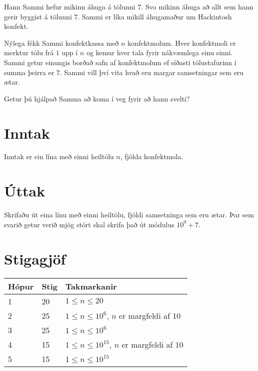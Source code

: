 
Hann Sammi hefur mikinn áhuga á tölunni $7$. Svo mikinn áhuga að allt sem hann gerir byggist á tölunni $7$. Sammi er líka mikill áhugamaður um Hackintosh konfekt.

Nýlega fékk Sammi konfektkassa með $n$ konfektmolum.
Hver konfektmoli er merktur tölu frá $1$ upp í $n$ og kemur hver tala fyrir nákvæmlega einu sinni.
Sammi getur einungis borðað safn af konfektmolum ef síðasti tölustafurinn í summa þeirra er $7$.
Sammi vill því vita hvað eru margar samsetningar sem eru ætar.

Getur þú hjálpað Samma að koma í veg fyrir að hann svelti?

\section*{Inntak}
Inntak er ein lína með einni heiltölu $n$, fjölda konfektmola.

\section*{Úttak}
Skrifaðu út eina línu með einni heiltölu, fjöldi samsetninga sem eru ætar.
Þar sem svarið getur verið mjög stórt skal skrifa það út módulus $10^9 + 7$.

\section*{Stigagjöf}
\begin{tabular}{|l|l|l|}
\hline
Hópur & Stig & Takmarkanir \\ \hline
1     & 20     & $1 \leq n \leq 20$ \\ \hline
2     & 25     & $1 \leq n \leq 10^6$, $n$ er margfeldi af 10 \\ \hline
3     & 25     & $1 \leq n \leq 10^6$ \\ \hline
4     & 15     & $1 \leq n \leq 10^{15}$, $n$ er margfeldi af 10 \\ \hline
5     & 15     & $1 \leq n \leq 10^{15}$ \\ \hline
\end{tabular}

